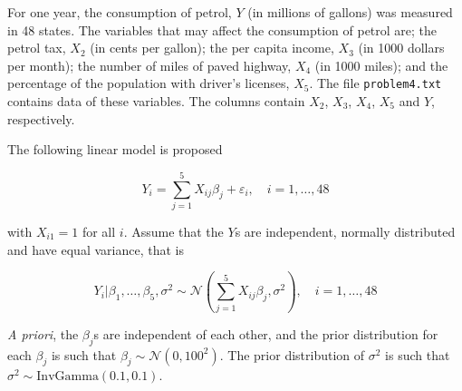 \documentclass[
]{homework}
\begin{document}
For one year, the consumption of petrol, \(Y\) (in millions of gallons) was measured in 48 states. The variables that may affect the consumption of petrol are; the petrol tax, \(X_2\)
(in cents per gallon); the per capita income, \(X_3\) (in 1000 dollars per month); the number of miles of paved highway, \(X_4\) (in 1000 miles); and the percentage of the population with
driver's licenses, \(X_5\). The file \texttt{problem4.txt} contains data of these variables. The columns contain \(X_2\), \(X_3\), \(X_4\), \(X_5\) and \(Y\), respectively.

The following linear model is proposed

\[
  Y_i = \sum_{j = 1}^5 X_{ij} \beta_j + \varepsilon_i, \quad i = 1, \ldots, 48
\]

with \(X_{i1} = 1\) for all \(i\). Assume that the \(Y\)s are independent, normally distributed and have equal variance, that is

\[
  Y_i | \beta_1, \ldots, \beta_5, \sigma^2 \sim \mathcal{N}\left(\sum_{j = 1}^5 X_{ij} \beta_j, \sigma^2\right), \quad i = 1, \ldots, 48
\]

\emph{A priori}, the \(\beta_j\)s are independent of each other, and the prior distribution for each \(\beta_j\) is such that \(\beta_j \sim \mathcal N(0, 100^2)\).
The prior distribution of \(\sigma^2\) is such that \(\sigma^2 \sim \mathrm{InvGamma}(0.1, 0.1)\).
\end{document}
